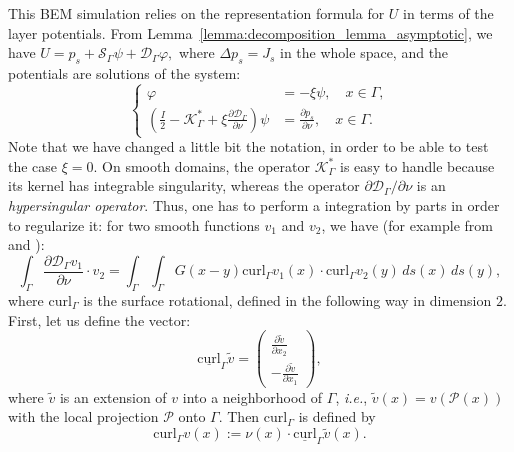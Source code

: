 This BEM simulation relies on the representation formula for $U$
in terms of the layer potentials. From
Lemma~\ref{lemma:decomposition_lemma_asymptotic}, we have
$U=p_s+\mathcal{S}_{\Gamma}\psi+\mathcal{D}_{\Gamma}\varphi,$ where
$\Delta p_s={J_s}$ in the whole space, and the potentials are
solutions of the system:
\begin{equation}
\left\{ \begin{alignedat}{1}\varphi & =-\xi\psi, \quad x \in \Gamma, \\
\left(\frac{I}{2}-\mathcal{K}_{\Gamma}^{*}+\xi\frac{\partial\mathcal{D}_{\Gamma}}
{\partial\nu}\right)\psi & =\frac{\partial p_s}{\partial\nu}, \quad
x \in \Gamma.
\end{alignedat}
\right.\label{eq:system_potential_U}
\end{equation}
Note that we have changed a little bit the notation, in order to
 be able to test the case $\xi=0$.
On smooth domains, the operator $\mathcal{K}_{\Gamma}^{*}$ is easy
to handle because its kernel has integrable singularity, whereas
the operator $\partial\mathcal{D}_{\Gamma}/\partial\nu$ is an
\emph{hypersingular operator}. Thus, one has to perform a
integration by parts in order to regularize it: for two smooth
functions $v_{1}$ and $v_{2}$, we have (for example from
\cite[Theorem 1]{nedelec1982integral} and \cite[Theorem
6.15]{steinbach2008numerical}):
\begin{equation}
\int_\Gamma \frac{\partial\mathcal{D}_{\Gamma} v_{1}}{\partial\nu}
\cdot v_{2}
=\int_{\Gamma}\int_{\Gamma}G(x-y)\textrm{curl}_{\Gamma}v_{1}
(x)\cdot\textrm{curl}_{\Gamma}v_{2}(y)\, ds(x)\, ds(y),
\label{eq:hypersingular-integration-by-parts}
\end{equation}
where $\textrm{curl}_{\Gamma}$ is the surface rotational, defined
in the following way in dimension $2$. First, let us define the
vector:
\[
\underline{\textrm{curl}}_{\Gamma}\tilde{v}=\left(\begin{alignedat}{1}\frac{\partial\tilde{v}}{\partial x_{2}}\\
-\frac{\partial\tilde{v}}{\partial x_{1}}
\end{alignedat}
\right),
\]
where $\tilde{v}$ is an extension of $v$ into a neighborhood of
$\Gamma$, \emph{i.e.}, $\tilde{v}(x)=v\left(\mathcal{P}(x)\right)$
with  the local projection $\mathcal{P}$ onto $\Gamma$. Then $
$$\textrm{curl}_{\Gamma}$ is defined by
\[
\textrm{curl}_{\Gamma}v(x):=\nu(x)\cdot\underline{\textrm{curl}}_{\Gamma}\tilde{v}(x).
\]


